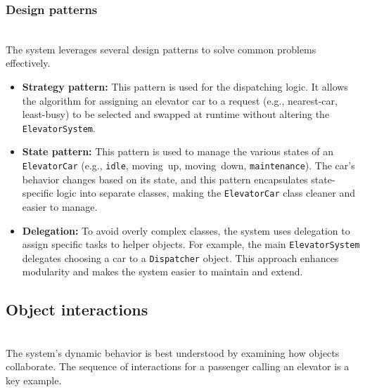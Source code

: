 \subsubsection{Design patterns}\label{qZxh8lTHgB1o6frQogITF}
\\
The system leverages several design patterns to solve common problems effectively.

\begin{itemize}
\item
\protect{}\label{b6zCWrOBsUGTnd2dt6LRz}
\textbf{Strategy pattern:} This pattern is used for the dispatching logic. It allows the algorithm for assigning an elevator car to a request (e.g., nearest-car, least-busy) to be selected and swapped at runtime without altering the \texttt{ElevatorSystem}.
\item
\protect{}\label{aOt9mosmHY_wcYJi6TJBg}
\textbf{State pattern:} This pattern is used to manage the various states of an \texttt{ElevatorCar} (e.g., \texttt{idle}, moving\ up, moving\ down, \texttt{maintenance}). The car's behavior changes based on its state, and this pattern encapsulates state-specific logic into separate classes, making the \texttt{ElevatorCar} class cleaner and easier to manage.
\item
\protect{}\label{Q8Bag1fbOFkaFYsA6qi_r}
\textbf{Delegation:} To avoid overly complex classes, the system uses delegation to assign specific tasks to helper objects. For example, the main \texttt{ElevatorSystem} delegates choosing a car to a \texttt{Dispatcher} object. This approach enhances modularity and makes the system easier to maintain and extend.
\end{itemize}

\subsection{Object interactions}\label{V6Y5bRSpASoC5bHRrkoBv}
\\
The system's dynamic behavior is best understood by examining how objects collaborate. The sequence of interactions for a passenger calling an elevator is a key example.

